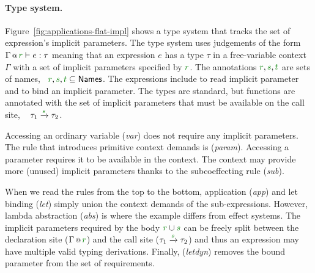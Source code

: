 \paragraph{Type system.}

Figure~\ref{fig:applications-flat-impl} shows a type system that tracks the set of expression's
implicit parameters. The type system uses judgements of the form $\coctx{\Gamma}{\cclrd{r}} \vdash e : \tau$
meaning that an expression $e$ has a type $\tau$ in a free-variable context $\Gamma$ with a set
of implicit parameters specified by $\cclrd{r}$. The annotations $\cclrd{r},\cclrd{s},\cclrd{t}$ are
sets of names, \ie~$\cclrd{r},\cclrd{s},\cclrd{t} \subseteq
\ident{Names}$. The expressions include  to read implicit
parameter and  to bind an implicit parameter. The types are standard, but functions are
annotated with the set of implicit parameters that must be available on the call site, \ie~
$\tau_1 \xrightarrow{\cclrd{s}} \tau_2$.

Accessing an ordinary variable (\emph{var}) does not require any implicit parameters. The rule that
introduces primitive context demands is (\emph{param}). Accessing a parameter 
requires it to be available in the context. The context may provide more (unused)
implicit parameters thanks to the subcoeffecting rule (\emph{sub}).

When we read the rules from the top to the bottom, application (\emph{app}) and let binding
(\emph{let}) simply union the context demands of the sub-expressions. However, lambda abstraction
(\emph{abs}) is where the example differs from effect systems. The implicit parameters required by
the body $\cclrd{r} \cup \cclrd{s}$ can be freely split between the declaration site ($\coctx{\Gamma}{\cclrd{r}}$)
and the call site ($\tau_1 \xrightarrow{\cclrd{s}} \tau_2$) and thus an expression may have multiple
valid typing derivations. Finally, (\emph{letdyn}) removes the bound parameter from the set of requirements.

